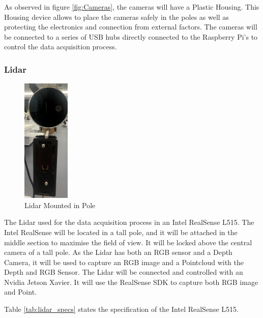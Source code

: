 \documentclass[12pt]{report}
\begin{document}
As observed in figure \ref{fig:Cameras}, the cameras will have a Plastic Housing. This Housing device allows to place the cameras safely 
in the poles as well as protecting the electronics and connection from external factors.
The cameras will be connected to a series of USB hubs directly connected to the Raspberry Pi's to control the data acquisition process.



\subsubsection*{Lidar}

\begin{figure}
  \begin{center}
    \includegraphics[width=0.2\textwidth]{IMG_5886_cropped.jpg}
  \end{center}                          
  \caption{Lidar Mounted in Pole}
  \label{fig:lidar_mounted}
\end{figure}
The Lidar used for the data acquisition process in an Intel RealSense L515.
The Intel RealSense will be located in a tall pole, and it will be attached in the middle section to maximise the field of view. It will be locked above the central camera of a tall pole.
As the Lidar has both an RGB sensor and a Depth Camera, it will be used to capture an RGB image and a Pointcloud with the Depth and RGB Sensor.
The Lidar will be connected and controlled with an Nvidia Jetson Xavier. It will use the RealSense SDK to capture both RGB image and Point.

Table \ref{tab:lidar_specs} states the specification of the Intel RealSense L515. 
\end{document}
